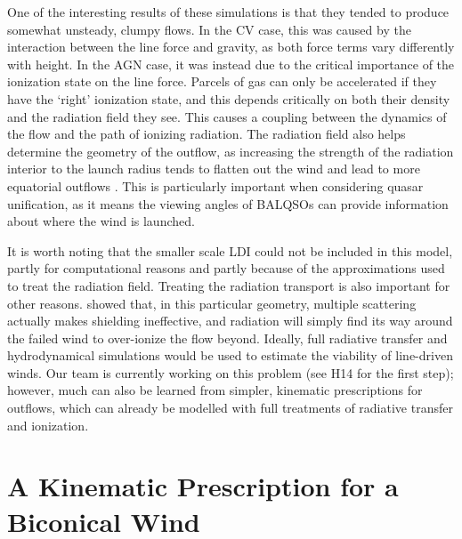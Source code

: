 One of the interesting results of these  simulations is that they tended
to produce somewhat unsteady, clumpy flows. In the CV case, this was caused by
the interaction between the line force and gravity, as both force terms vary 
differently with height. In the AGN case, it was instead due to the critical
importance of the ionization state on the line force. Parcels of gas can only 
be accelerated if they have the `right' ionization state, and this depends
critically on both their density and the radiation field they see. This causes
a coupling between the dynamics of the flow and the path of ionizing radiation. 
The radiation field also helps
determine the geometry of the outflow, as increasing the strength of the radiation
interior to the launch radius tends to flatten out the wind and lead to more
equatorial outflows \citep{proga2005}.
This is particularly important when considering quasar unification, as it means
the viewing angles of BALQSOs can provide information about where the wind is launched.

It is worth noting that the smaller scale LDI could not be included in this model,
partly for computational reasons and partly because of the approximations 
used to treat the radiation field. Treating the radiation transport is also
important for other reasons. 
\citet[][hereafter H14]{H14} showed that, in this particular geometry, 
multiple scattering actually makes shielding
ineffective, and radiation will simply find its way around the failed wind
to over-ionize the flow beyond.
Ideally, full radiative transfer and hydrodynamical simulations would be used
to estimate the viability of line-driven winds. Our team is currently working 
on this problem (see H14 for the first step); however, much 
can also be learned from simpler, kinematic prescriptions for outflows, which can
already be modelled with full treatments of radiative transfer and ionization.  

\section{A Kinematic Prescription for a Biconical Wind}
\label{sec:sv93_model}

